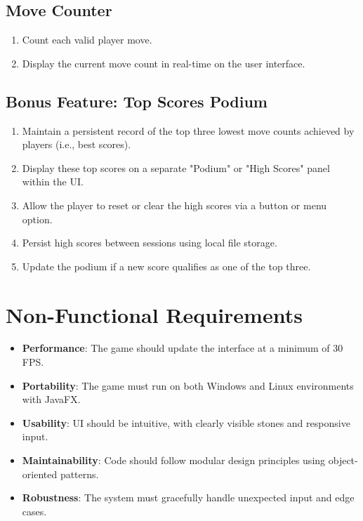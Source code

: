 \documentclass[11.5pt, oneside]{scrartcl}
\begin{document}
	\subsection{Move Counter}
	\begin{enumerate}[label=\textbf{FR\arabic*}, labelwidth=3em, labelsep=0.5em, leftmargin=4em, align=left, start=12]
		\itemsep0pt
		\item Count each valid player move.
		\item Display the current move count in real-time on the user interface.
	\end{enumerate}
	
	\subsection{Bonus Feature: Top Scores Podium}
	\begin{enumerate}[label=\textbf{FR\arabic*}, labelwidth=3em, labelsep=0.5em, leftmargin=4em, align=left, start=14]
		\itemsep0pt
		\item Maintain a persistent record of the top three lowest move counts achieved by players (i.e., best scores).
		\item Display these top scores on a separate "Podium" or "High Scores" panel within the UI.
		\item Allow the player to reset or clear the high scores via a button or menu option.
		\item Persist high scores between sessions using local file storage.
		\item Update the podium if a new score qualifies as one of the top three.
	\end{enumerate}
	
	
	\section{Non-Functional Requirements}
	
	\begin{itemize}[noitemsep]
		\item \textbf{Performance}: The game should update the interface at a minimum of 30 FPS.
		\item \textbf{Portability}: The game must run on both Windows and Linux environments with JavaFX.
		\item \textbf{Usability}: UI should be intuitive, with clearly visible stones and responsive input.
		\item \textbf{Maintainability}: Code should follow modular design principles using object-oriented patterns.
		\item \textbf{Robustness}: The system must gracefully handle unexpected input and edge cases.
	\end{itemize}
	
\end{document}
